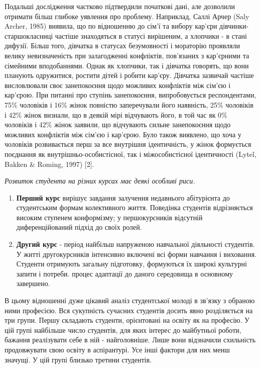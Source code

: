 \documentclass[a4paper,12pt, titlepage]{article}
\begin{document}
    Подальші дослідження частково підтвердили початкові
    дані, але дозволили отримати більш глибоке уявлення про проблему.
    Наприклад, Саллі Арчер (Saly Archer, 1985) виявила, що по відношенню до
    сім'ї та вибору кар'єри дівчинки-старшокласниці частіше знаходяться в статусі
    вирішеним, а хлопчики - в стані дифузії. Більш того, дівчатка в
    статусах безумовності і мораторію проявляли велику
    невизначеність при залагодженні конфліктів, пов'язаних з кар'єрними та
    сімейними вподобаннями. Однак як хлопчики, так і дівчатка говорять,
    що вони планують одружитися, ростити дітей і робити кар'єру. Дівчатка
    зазвичай частіше висловлювали своє занепокоєння щодо можливих
    конфліктів між сім'єю і кар'єрою. При питанні про ступінь занепокоєння,
    випробовується респондентами, 75\% чоловіків і 16\% жінок повністю
    заперечували його наявність, 25\% чоловіків і 42\% жінок визнали, що в
    деякій мірі відчувають його, в той час як 0\% чоловіків і 42\% жінок
    заявили, що відчувають сильне занепокоєння щодо можливих
    конфліктів між сім'єю і кар'єрою. Було також виявлено, що хоча у
    чоловіків розвивається перш за все внутрішня ідентичність, у
    жінок формується поєднання як внутрішньо-особистісної, так і
    міжособистісної ідентичності (Lytel, Bakken & Roming, 1997) [2].

    \textit{Розвиток студента на різних курсах має деякі особливі риси.}
    \begin{enumerate}
        \item \textbf{Перший курс} вирішує завдання залучення недавнього абітурієнта до
        студентським формам колективного життя. Поведінка студентів відрізняється
        високим ступенем конформізму; у першокурсників відсутній
        диференційований підхід до своїх ролей.
        \item \textbf{Другий курс} - період найбільш напруженою навчальної діяльності
        студентів. У житті другокурсників інтенсивно включені всі форми
        навчання і виховання. Студенти отримують загальну підготовку,
        формуються їх широкі культурні запити і потреби. процес
        адаптації до даного середовища в основному завершено.
    \end{enumerate}
    В цьому відношенні дуже цікавий аналіз студентської молоді в
    зв'язку з обраною ними професією. Вся сукупність сучасних
    студентів досить явно розділяється на три групи.
    Першу складають студенти, орієнтовані на освіту як на
    професію. У цій групі найбільше число студентів, для яких інтерес
    до майбутньої роботи, бажання реалізувати себе в ній - найголовніше. Лише вони
    відзначили схильність продовжувати свою освіту в аспірантурі. Усе
    інші фактори для них менш значущі. У цій групі близько третини студентів.
\end{document}
